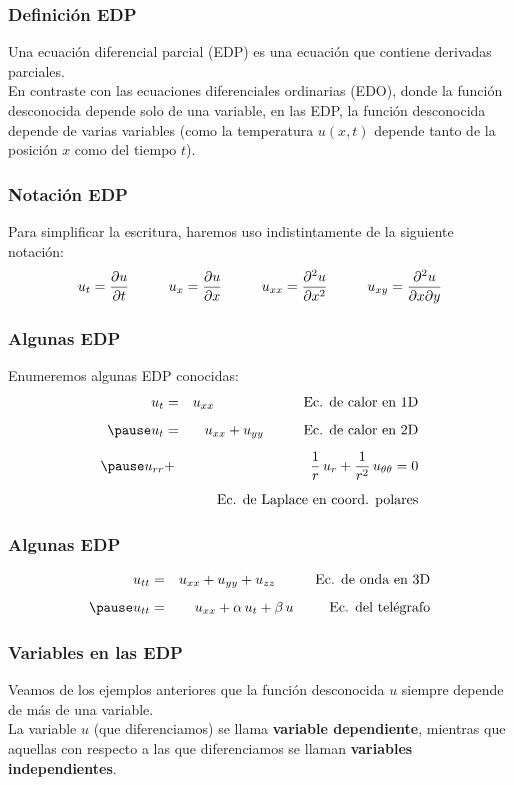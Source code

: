 \documentclass[12pt]{beamer}
\begin{document}
\begin{frame}
\frametitle{Definición EDP}
Una ecuación diferencial parcial (EDP) es una ecuación que contiene derivadas parciales. 
\\
\bigskip
En contraste con las ecuaciones diferenciales ordinarias (EDO), donde la función desconocida depende solo de una variable, en las EDP, la función desconocida depende de varias variables (como la temperatura $u (x, t)$ depende tanto de la posición $x$ como del tiempo $t$).
\end{frame}
\begin{frame}
\frametitle{Notación EDP}
Para simplificar la escritura, haremos uso indistintamente de la siguiente notación:
\begin{align*}
u_{t} = \pdv{u}{t} \hspace{1cm} u_{x} = \pdv{u}{x} \hspace{1cm} u_{xx} = \pdv[2]{u}{x} \hspace{1cm} u_{xy} = \pdv[2]{u}{x}{y}
\end{align*}
\end{frame}
\begin{frame}
\frametitle{Algunas EDP}
Enumeremos algunas EDP conocidas:
\begin{eqnarray*}
u_{t} &=& u_{xx} \hspace{2.25cm} \mbox{Ec. de calor en 1D} \\[0.5em] \pause
u_{t} &=& u_{xx} + u_{yy} \hspace{1cm} \mbox{Ec. de calor en 2D} \\[0.5em] \pause
u_{rr} &+& \dfrac{1}{r} \, u_{r} + \dfrac{1}{r^{2}} \, u_{\theta \theta} = 0 \\[0.5em]
&{}& \mbox{Ec. de Laplace en coord. polares}
\end{eqnarray*}
\end{frame}
\begin{frame}
\frametitle{Algunas EDP}
\begin{eqnarray*}
u_{tt} &=& u_{xx} + u_{yy} + u_{zz} \hspace{1cm} \mbox{Ec. de onda en 3D} \\[0.5em] \pause
u_{tt} &=& u_{xx} + \alpha \, u_{t} + \beta \, u \hspace{0.9cm} \mbox{Ec. del telégrafo}
\end{eqnarray*}
\end{frame}
\begin{frame}
\frametitle{Variables en las EDP}
Veamos de los ejemplos anteriores que la función desconocida $u$ siempre depende de más de una variable.
\\
\bigskip
La variable $u$ (que diferenciamos) se llama \textbf{variable dependiente}, mientras que aquellas con respecto a las que diferenciamos se llaman \textbf{variables independientes}.
\end{frame}
\end{document}
